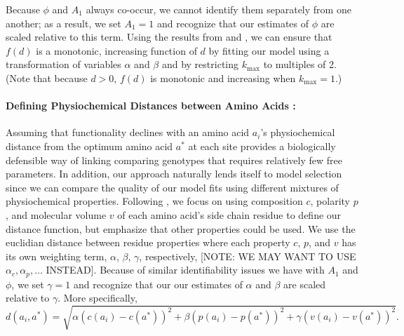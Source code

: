 \documentclass{article}
\newcommand{\kmax}{\ensuremath{{k_{\max}}}\xspace}
\newcommand{\aopt}{\ensuremath{a^*}\xspace}
\begin{document}
Because $\phi$ and $A_1$ always co-occur, we cannot identify them separately from one another; as a result, we set $A_1 = 1$ and recognize that our estimates of $\phi$ are scaled relative to this term.
Using the results from \citet{Liang07} and \citet{Elphinstone85}, we can ensure that $f(d)$ is a monotonic, increasing function of $d$ by fitting our model using a transformation of variables $\alpha$ and $\beta$ and by restricting \kmax to multiples of 2. (Note that because $d > 0$, $f(d)$ is monotonic and increasing when $\kmax=1$.)


\paragraph*{Defining Physiochemical Distances between Amino Acids :}
Assuming that functionality declines with an amino acid $a_i$'s physiochemical distance from the optimum amino acid \aopt at each site  provides a biologically defensible way of linking comparing genotypes that requires relatively few free parameters.
In addition, our approach naturally lends itself to model selection since we can compare the quality of our model fits using different mixtures of physiochemical properties.
Following \citet{Grantham74}, we focus on using composition $c$, polarity $p$, and molecular volume $v$ of each amino acid's side chain residue to define our distance function, but emphasize that other properties could be used.
We use the euclidian distance between residue properties where each property $c$, $p$, and $v$ has its own weighting term, $\alpha$, $\beta$, $\gamma$, respectively, [NOTE: WE MAY WANT TO USE $\alpha_c, \alpha_p, \ldots $ INSTEAD].
Because of similar identifiability issues we have with $A_1$ and $\phi$, we set $\gamma = 1$ and recognize that our our estimates of $\alpha$ and $\beta$ are scaled relative to $\gamma$.
More specifically,
\begin{equation*}
  d(a_i, \aopt) = \sqrt{\alpha \left(c\left(a_i\right) - c\left(\aopt\right)\right)^2 + \beta \left(p\left(a_i\right) - p\left(\aopt\right)\right)^2 +  \gamma \left(v\left(a_i\right) - v\left(\aopt\right)\right)^2}.
\end{equation*}
\end{document}
